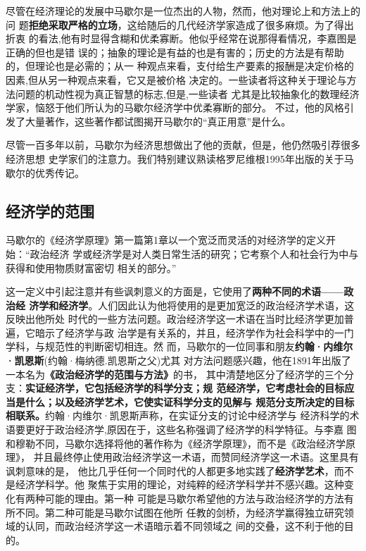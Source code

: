 尽管在经济理论的发展中马歇尔是一位杰出的人物，然而，他对理论上和方法上的问
题\textbf{拒绝采取严格的立场}，这给随后的几代经济学家造成了很多麻烦。为了得出折衷
的看法,他有时显得含糊和优柔寡断。他似乎经常在说那得看情况，李嘉图是正确的但也是错
误的；抽象的理论是有益的也是有害的；历史的方法是有帮助的，但理论也是必需的；从一
种观点来看，支付给生产要素的报酬是决定价格的因素,但从另一种观点来看，它又是被价格
决定的。一些读者将这种关于理论与方法问题的机动性视为真正智慧的标志,但是,一些读者
尤其是比较抽象化的数理经济学家，恼怒于他们所认为的马歇尔经济学中优柔寡断的部分。
不过，他的风格引发了大量著作，这些著作都试图揭开马歇尔的“真正用意”是什么。

尽管一百多年以前，马歇尔为经济思想做出了他的贡献，但是，他仍然吸引荐很多经济思想
史学家们的注意力。我们特别建议熟读格罗尼维根1995年出版的关于马歇尔的优秀传记。

\subsection{经济学的范围}

马歇尔的《经济学原理》第一篇第1章以一个宽泛而灵活的对经济学的定义开始：“政治经济
学或经济学是对人类日常生活的研究；它考察个人和社会行为中与获得和使用物质财富密切
相关的部分。”

这一定义中引起注意并有些讽刺意义的方面是，它使用了\textbf{两种不同的术语——政治经
  济学和经济学}。人们因此认为他将使用的是更加宽泛的政治经济学术语，这反映出他所处
时代的一些方法问题。政治经济学这一术语在当时比经济学更加普遍，它暗示了经济学与政
治学是有关系的，并且，经济学作为社会科学中的一门学科，与规范性的判断密切相连。然
而，马歇尔的一位同事和朋友\textbf{约翰·内维尔·凯恩斯}(约翰·梅纳德.凯恩斯之父)尤其
对方法问题感兴趣，他在1891年出版了一本名为\textbf{《政治经济学的范围与方法》}的书，
其中清楚地区分了经济学的三个分支：\textbf{实证经济学，它包括经济学的科学分支；规
  范经济学，它考虑社会的目标应当是什么；以及经济学艺术，它使实证科学分支的见解与
  规范分支所决定的目标相联系。}约翰·内维尔·凯恩斯声称，在实证分支的讨论中经济学与
经济科学的术语要更好于政治经济学,原因在于，这些名称强调了经济学的科学特征。与李嘉
图和穆勒不同，马歇尔选择将他的著作称为《经济学原理》，而不是《政治经济学原理》，
并且最终停止使用政治经济学这一术语，而赞同经济学这一术语。这里具有讽刺意味的是，
他比几乎任何一个同时代的人都更多地实践了\textbf{经济学艺术}，而不是经济学科学。他
聚焦于实用的理论，对纯粹的经济学科学并不感兴趣。这种变化有两种可能的理由。第一种
可能是马歇尔希望他的方法与政治经济学的方法有所不同。第二种可能是马歇尔试图在他所
任教的剑桥，为经济学赢得独立研究领域的认同，而政治经济学这一术语暗示着不同领域之
间的交叠，这不利于他的目的。

